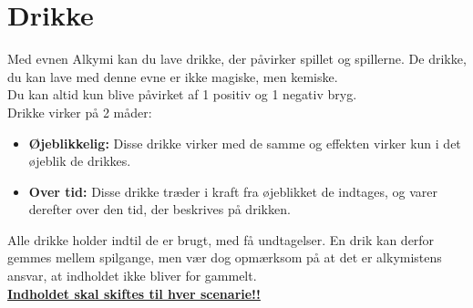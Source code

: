 \chapter*{Drikke}

Med evnen Alkymi kan du lave drikke, der påvirker spillet og spillerne. De drikke, du kan lave med denne evne er ikke magiske, men kemiske.\\
Du kan altid kun blive påvirket af 1 positiv og 1 negativ bryg.\\
Drikke virker på 2 måder:
\begin{itemize}
    \item \textbf{Øjeblikkelig:} Disse drikke virker med de samme og effekten virker kun i det øjeblik de drikkes.
    \item \textbf{Over tid:} Disse drikke træder i kraft fra øjeblikket de indtages, og varer derefter over den tid, der beskrives på drikken.
\end{itemize}

Alle drikke holder indtil de er brugt, med få undtagelser. En drik kan derfor gemmes mellem spilgange, men vær dog opmærksom på at det er alkymistens ansvar, at indholdet ikke bliver for gammelt.\\
\textbf{\underline{Indholdet skal skiftes til hver scenarie!!}}

